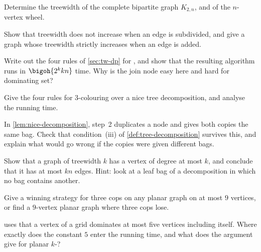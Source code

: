 \begin{exercise}
Determine the treewidth of the complete bipartite graph $K_{2,n}$, and of the
$n$-vertex wheel.
\end{exercise}

\begin{exercise}
Show that treewidth does not increase when an edge is subdivided, and give a
graph whose treewidth strictly increases when an edge is added.
\end{exercise}

\begin{exercise}
Write out the four rules of \cref{sec:tw-dp} for , and show that the resulting algorithm runs in
$\bigoh{2^k k n}$ time. Why is the join node easy here and hard for dominating
set?
\end{exercise}

\begin{exercise}
Give the four rules for $3$-colouring over a nice tree decomposition, and
analyse the running time.
\end{exercise}

\begin{exercise}
In \cref{lem:nice-decomposition}, step~2 duplicates a node and gives both
copies the same bag. Check that condition~(iii) of
\cref{def:tree-decomposition} survives this, and explain what would go wrong if
the copies were given different bags.
\end{exercise}

\begin{exercise}
Show that a graph of treewidth $k$ has a vertex of degree at most $k$, and
conclude that it has at most $kn$ edges. Hint: look at a leaf bag of a
decomposition in which no bag contains another.
\end{exercise}

\begin{exercise}
Give a winning strategy for three cops on any planar graph on at most $9$
vertices, or find a $9$-vertex planar graph where three cops lose.
\end{exercise}

\begin{exercise}
 uses that a vertex of a grid dominates at most
five vertices including itself. Where exactly does the constant $5$ enter the
running time, and what does the argument give for planar
$k$-?
\end{exercise}
